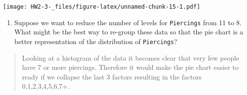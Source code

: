 \documentclass[]{article}
\newenvironment{Shaded}{\begin{snugshade}}{\end{snugshade}}
\newcommand{\KeywordTok}[1]{\textcolor[rgb]{0.13,0.29,0.53}{\textbf{#1}}}
\newcommand{\NormalTok}[1]{#1}
\newcommand{\OperatorTok}[1]{\textcolor[rgb]{0.81,0.36,0.00}{\textbf{#1}}}
\providecommand{\tightlist}{%
  \setlength{\itemsep}{0pt}\setlength{\parskip}{0pt}}
\begin{document}
\begin{Shaded}
\end{Shaded}

\texttt{[image: HW2-3-\_files/figure-latex/unnamed-chunk-15-1.pdf]}

\begin{enumerate}
\def\labelenumi{\alph{enumi})}
\setcounter{enumi}{4}
\tightlist
\item
  Suppose we want to reduce the number of levels for \texttt{Piercings}
  from 11 to 8. What might be the best way to re-group these data so
  that the pie chart is a better representation of the distribution of
  \texttt{Piercings}?
\end{enumerate}

\begin{quote}
Looking at a histogram of the data it becomes clear that very few people
have 7 or more piercings. Therefore it would make the pie chart easier
to ready if we collapse the last 3 factors resulting in the factors
0,1,2,3,4,5,6,7+.
\end{quote}
\end{document}
